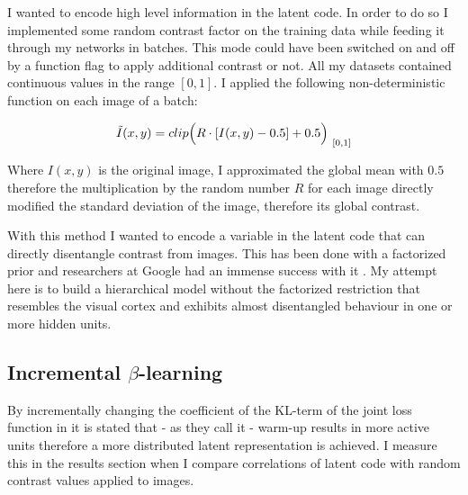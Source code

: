 \documentclass[12pt, english]{article}
\begin{document}
\par I wanted to encode high level information in the latent code. In order to do so I implemented some random contrast factor on the training data while feeding it through my networks in batches. This mode could have been switched on and off by a function flag to apply additional contrast or not. All my datasets contained continuous values in the range $[0, 1]$. I applied the following non-deterministic function on each image of a batch:

\vspace{4mm}

\begin{equation}
    \Tilde{I}(x, y) = clip\Big(R \cdot [I(x, y) - 0.5] + 0.5\Big)_{\ [0, 1]}
\end{equation}

\vspace{4mm}

\par Where $I(x, y)$ is the original image, I approximated the global mean with $0.5$ therefore the multiplication by the random number $R$ for each image directly modified the standard deviation of the image, therefore its global contrast.

\vspace{4mm}

\par With this method I wanted to encode a variable in the latent code that can directly disentangle contrast from images. This has been done with a factorized prior and researchers at Google had an immense success with it \cite{DBLP:journals/corr/abs-1811-12359}. My attempt here is to build a hierarchical model without the factorized restriction that resembles the visual cortex and exhibits almost disentangled behaviour in one or more hidden units.

\vspace{5mm}

\subsection{Incremental $\beta$-learning}

\vspace{5mm}

\par By incrementally changing the coefficient of the KL-term of the joint loss function in \cite{sonderby2016ladder} it is stated that - as they call it - warm-up results in more active units therefore a more distributed latent representation is achieved. I measure this in the results section when I compare correlations of latent code with random contrast values applied to images.
\end{document}
